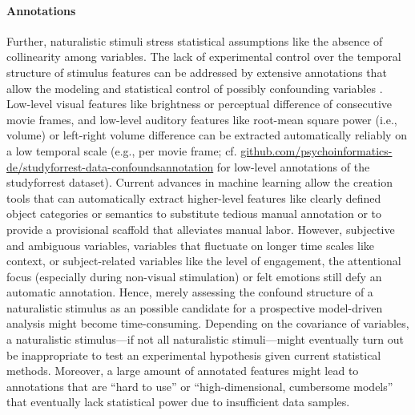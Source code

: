 \paragraph{Annotations}
%
Further, naturalistic stimuli stress statistical assumptions like the absence of
collinearity among variables.
%
The lack of experimental control over the temporal structure of stimulus
features can be addressed by extensive annotations that allow the modeling and
statistical control of possibly confounding variables
\citep[e.g.,][]{deniz2019representation}.
%
Low-level visual features like brightness or
perceptual difference of consecutive movie frames, and low-level auditory
features like root-mean square power (i.e., volume) or left-right volume
difference can be extracted automatically reliably on a low temporal scale
(e.g., per movie frame; cf.
\href{https://github.com/psychoinformatics-de/studyforrest-data-confoundsannotation
}{\url{github.com/psychoinformatics-de/studyforrest-data-confoundsannotation}}
for low-level annotations of the studyforrest dataset).
%
Current advances in machine learning allow the creation tools \citep[e.g., the
toolbox ``pliers'' that is implemented in the
\href{https://neuroscout.org/}{\url{neuroscout.org}}
platform;][]{mcnamara2017developing, delavega2022neuroscout} that can
automatically extract higher-level features like clearly defined object
categories or semantics to substitute tedious manual annotation or to provide a
provisional scaffold that alleviates manual labor.
%
However, subjective and ambiguous variables, variables that fluctuate on longer
time scales like context, or subject-related variables like the level of
engagement, the attentional focus (especially during non-visual stimulation) or
felt emotions \citep[cf., e.g.,][]{lettieri2019emotionotopy,
saarimaki2021naturalistic} still defy an automatic annotation.
%
Hence, merely assessing the confound structure of a naturalistic stimulus as an
possible candidate for a prospective model-driven analysis might become
time-consuming.
%
Depending on the covariance of variables, a naturalistic stimulus---if not all
naturalistic stimuli---might eventually turn out be inappropriate to test an
experimental hypothesis given current statistical methods.
%
Moreover, a large amount of annotated features might lead to annotations that
are ``hard to use'' \citep[][p. 2]{richard2019fast} or ``high-dimensional,
cumbersome models'' \citep[][p. 2]{richard2019fast} that eventually lack
statistical power due to insufficient data samples.



